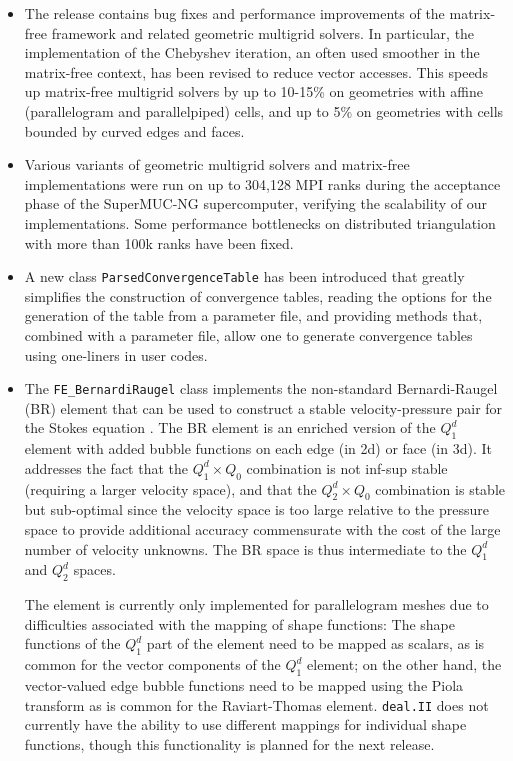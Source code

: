 \documentclass{ansarticle-preprint}
\newcommand{\specialword}[1]{\texttt{#1}}
\newcommand{\dealii}{{\specialword{deal.II}}\xspace}
\begin{document}
\begin{itemize}
\item
  The release contains bug fixes and performance improvements of the
  matrix-free framework and related geometric multigrid solvers. In
  particular, the implementation of the Chebyshev iteration, an often used
  smoother in the matrix-free context, has been revised to reduce vector
  accesses. This speeds up matrix-free multigrid solvers by up to 10-15\%
  on geometries with affine (parallelogram and parallelpiped) cells, and up
  to 5\% on geometries with cells bounded by curved edges and faces.

\item
  Various variants of geometric multigrid solvers and matrix-free
  implementations were run on up to 304,128 MPI ranks during the acceptance
  phase of the SuperMUC-NG supercomputer, verifying the scalability of our
  implementations. Some performance bottlenecks on distributed
  triangulation with more than 100k ranks have been fixed.

\item A new class \texttt{ParsedConvergenceTable} has been introduced
  that greatly simplifies the construction of convergence tables,
  reading the options for the generation of the table from a parameter
  file, and providing methods that, combined with a parameter file,
  allow one to generate convergence tables using one-liners in user
  codes.

\item
  The \texttt{FE\_BernardiRaugel} class implements the non-standard
  Bernardi-Raugel (BR) element that can be used to construct a stable
  velocity-pressure pair for the Stokes equation \cite{BR85}. The BR
  element is an enriched version of the $Q_1^d$ element with added bubble
  functions on each edge (in 2d) or face (in 3d). It addresses the fact
  that the $Q_1^d\times Q_0$ combination is not inf-sup stable (requiring a
  larger velocity space), and that the $Q_2^d\times Q_0$ combination is
  stable but sub-optimal since the velocity space is too large relative to
  the pressure space to provide additional accuracy commensurate with the
  cost of the large number of velocity unknowns. The BR space is
  thus intermediate to the $Q_1^d$ and $Q_2^d$ spaces.

  The element is currently only implemented for parallelogram meshes due to
  difficulties associated with the mapping of shape functions: The shape
  functions of the $Q_1^d$ part of the element need to be mapped as
  scalars, as is common for the vector components of the $Q_1^d$ element;
  on the other hand, the vector-valued edge bubble functions need to be
  mapped using the Piola transform as is common for the Raviart-Thomas
  element. \dealii{} does not currently have the ability to use different
  mappings for individual shape functions, though this functionality is
  planned for the next release.


\end{itemize}
\end{document}
